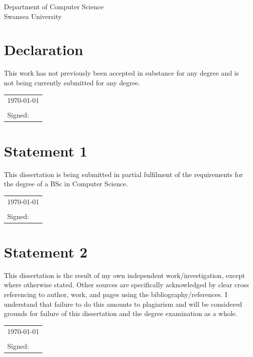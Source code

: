 \documentclass[10pt]{article}
\begin{document}
\begin{center}
Department of Computer Science\\
Swansea University
\end{center}

\thispagestyle{empty}

\newpage

\thispagestyle{empty}

\section*{Declaration}

This work has not previously been accepted in substance for any degree
and is not being currently submitted for any degree.

\vspace{0.5cm}
\begin{tabular}{l}
\today\\
\\
Signed:
\end{tabular}

\section*{Statement 1}
This dissertation is being submitted in partial fulfilment of the
requirements for the degree of a BSc in Computer Science.

\vspace{0.5cm}
\begin{tabular}{l}
\today\\
\\
Signed:
\end{tabular}

\section*{Statement 2}

This dissertation is the result of my own independent
work/investigation, except where otherwise stated. Other sources are
specifically acknowledged by clear cross referencing to author, work,
and pages using the bibliography/references. I understand that failure
to do this amounts to plagiarism and will be considered grounds for
failure of this dissertation and the degree examination as a whole.

\vspace{0.5cm}
\begin{tabular}{l}
\today\\
\\
Signed:
\end{tabular}
\end{document}
